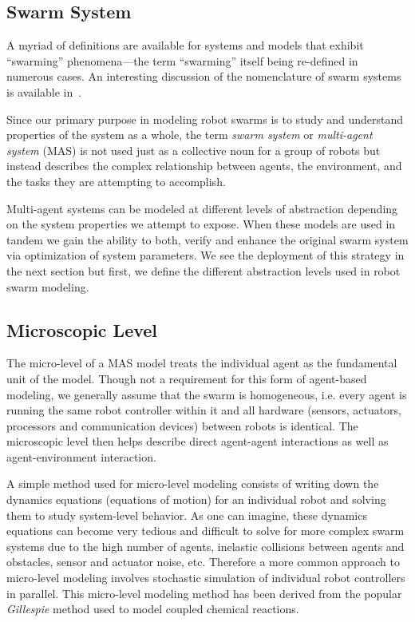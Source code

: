 \documentclass[Main.tex]{subfiles}
\begin{document}
\subsection{Swarm System}
A myriad of definitions are available for systems and models that exhibit ``swarming'' phenomena---the term ``swarming'' itself being re-defined in numerous cases. An interesting discussion of the nomenclature of swarm systems is available in~\citep{Beni2005,Beni2005a}.

Since our primary purpose in modeling robot swarms is to study and understand properties of the system as a whole, the term \emph{swarm system} or \emph{multi-agent system} (MAS) is not used just as a collective noun for a group of robots but instead describes the complex relationship between agents, the environment, and the tasks they are attempting to accomplish.

Multi-agent systems can be modeled at different levels of abstraction depending on the system properties we attempt to expose. When these models are used in tandem we gain the ability to both, verify and enhance the original swarm system via optimization of system parameters. We see the deployment of this strategy in the next section but first, we define the different abstraction levels used in robot swarm modeling.


\subsection{Microscopic Level}
The micro-level of a MAS model treats the individual agent as the fundamental unit of the model\citep{Lerman2001a}. Though not a requirement for this form of agent-based modeling, we generally assume that the swarm is homogeneous, i.e. every agent is running the same robot controller within it and all hardware (sensors, actuators, processors and communication devices) between robots is identical. The microscopic level then helps describe direct agent-agent interactions as well as agent-environment interaction. 

A simple method used for micro-level modeling consists of writing down the dynamics equations (equations of motion) for an individual robot and solving them to study system-level behavior. As one can imagine, these dynamics equations can become very tedious and difficult to solve for more complex swarm systems due to the high number of agents, inelastic collisions between agents and obstacles, sensor and actuator noise, etc. Therefore a more common approach to micro-level modeling involves stochastic simulation of individual robot controllers in parallel. This micro-level modeling method has been derived from the popular \emph{Gillespie} method\citep{Gillespie1976,Gillespie1977} used to model coupled chemical reactions.
\end{document}
